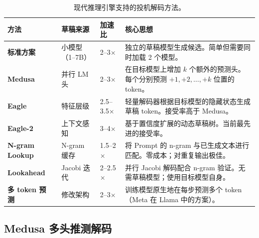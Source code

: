 \begin{table}[ht!]
\centering\small
\caption{现代推理引擎支持的投机解码方法。}
\noindent\begin{tabularx}{\linewidth}{@{}l l l Z{1}@{}}
\toprule
\textbf{方法} & \textbf{草稿来源} & \textbf{加速比} & \textbf{核心思想} \\
\midrule
\textbf{标准方案}~\cite{leviathan2023fast} & 小模型（1--7B） & 2--3$\times$ & 独立的草稿模型生成候选。简单但需要同时加载 2 个模型。 \\
\textbf{Medusa}~\cite{cai2024medusa} & 并行 LM 头 & 2--3$\times$ & 在目标模型上增加 $k$ 个额外的预测头。每个分别预测 $+1, +2, \ldots, +k$ 位置的 token。 \\
\textbf{Eagle}~\cite{li2024eagle} & 特征层级 & 2.5--3.5$\times$ & 轻量解码器根据目标模型的隐藏状态生成草稿 token。接受率高于 Medusa。 \\
\textbf{Eagle-2}~\cite{li2024eagle} & 上下文感知 & 3--4$\times$ & 基于置信度扩展的动态草稿树。当前最先进的接受率。 \\
\textbf{N-gram Lookup} & N-gram 缓存 & 1.5--2$\times$ & 将 Prompt 的 n-gram 与已生成文本进行匹配。零成本；对重复输出极佳。 \\
\textbf{Lookahead}~\cite{fu2024lookahead} & Jacobi 迭代 & 2--2.5$\times$ & 并行 Jacobi 解码配合 n-gram 验证。无需草稿模型；使用目标模型自身。 \\
\textbf{多 token 预测}~\cite{gloeckle2024multi} & 修改架构 & 2--3$\times$ & 训练模型原生地在每步预测多个 token（Meta 在 Llama 中的方案）。 \\
\bottomrule
\end{tabularx}
\end{table}

\subsection{Medusa 多头推测解码}
\label{medusa-multi-head-speculative-decoding}


